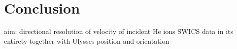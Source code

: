 
\chapter{Conclusion} %

\label{chap:concl} %

aim: directional resolution of velocity of incident He ions
SWICS data in its entirety
together with
Ulysses position and orientation 